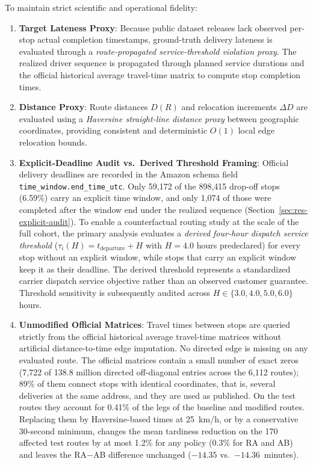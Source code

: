 \documentclass[11pt,a4paper]{article}
\begin{document}
To maintain strict scientific and operational fidelity:
\begin{enumerate}
    \item \textbf{Target Lateness Proxy}: Because public dataset releases lack observed per-stop actual completion timestamps, ground-truth delivery lateness is evaluated through a \emph{route-propagated service-threshold violation proxy}. The realized driver sequence is propagated through planned service durations and the official historical average travel-time matrix to compute stop completion times.
    \item \textbf{Distance Proxy}: Route distances $D(R)$ and relocation increments $\Delta D$ are evaluated using a \emph{Haversine straight-line distance proxy} between geographic coordinates, providing consistent and deterministic $O(1)$ local edge relocation bounds.
    \item \textbf{Explicit-Deadline Audit vs.\ Derived Threshold Framing}: Official delivery deadlines are recorded in the Amazon schema field \texttt{time\_window.end\_time\_utc}. Only 59,172 of the 898,415 drop-off stops (6.59\%) carry an explicit time window, and only 1,074 of those were completed after the window end under the realized sequence (Section~\ref{sec:res-explicit-audit}). To enable a counterfactual routing study at the scale of the full cohort, the primary analysis evaluates a \emph{derived four-hour dispatch service threshold} ($\tau_i(H) = t_{\text{departure}} + H$ with $H=4.0$ hours predeclared) for every stop without an explicit window, while stops that carry an explicit window keep it as their deadline. The derived threshold represents a standardized carrier dispatch service objective rather than an observed customer guarantee. Threshold sensitivity is subsequently audited across $H \in \{3.0, 4.0, 5.0, 6.0\}$ hours.
    \item \textbf{Unmodified Official Matrices}: Travel times between stops are queried strictly from the official historical average travel-time matrices without artificial distance-to-time edge imputation. No directed edge is missing on any evaluated route. The official matrices contain a small number of exact zeros (7,722 of 138.8 million directed off-diagonal entries across the 6,112 routes); 89\% of them connect stops with identical coordinates, that is, several deliveries at the same address, and they are used as published. On the test routes they account for 0.41\% of the legs of the baseline and modified routes. Replacing them by Haversine-based times at 25~km/h, or by a conservative 30-second minimum, changes the mean tardiness reduction on the 170 affected test routes by at most 1.2\% for any policy (0.3\% for RA and AB) and leaves the RA$-$AB difference unchanged ($-14.35$ vs.\ $-14.36$~minutes).
\end{enumerate}
\end{document}
